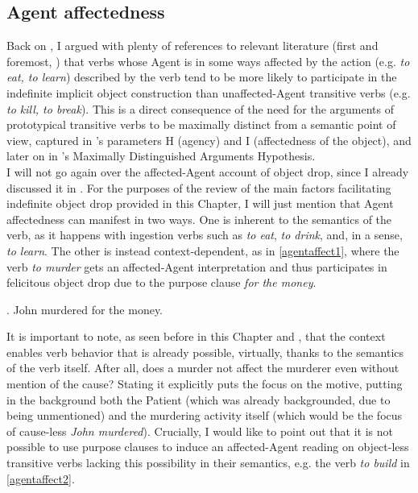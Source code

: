 \subsection{Agent affectedness} 

Back on , I argued with plenty of references to relevant literature (first and foremost, \textcite{Naess2007}) that verbs whose Agent is in some ways affected by the action (e.g. \textit{to eat, to learn}) described by the verb tend to be more likely to participate in the indefinite implicit object construction than unaffected-Agent transitive verbs (e.g. \textit{to kill, to break}). This is a direct consequence of the need for the arguments of prototypical transitive verbs to be maximally distinct from a semantic point of view, captured in \textcite{HopperThompson1980}'s parameters H (agency) and I (affectedness of the object), and later on in \textcite{Naess2007}'s Maximally Distinguished Arguments Hypothesis.\\
I will not go again over the affected-Agent account of object drop, since I already discussed it in . For the purposes of the review of the main factors facilitating indefinite object drop provided in this Chapter, I will just mention that Agent affectedness can manifest in two ways. One is inherent to the semantics of the verb, as it happens with ingestion verbs such as \textit{to eat}, \textit{to drink}, and, in a sense, \textit{to learn}. The other is instead context-dependent, as in \ref{agentaffect1}, where the verb \textit{to murder} gets an affected-Agent interpretation and thus participates in felicitous object drop due to the purpose clause \textit{for the money}.

\ex. \label{agentaffect1} John murdered for the money. \hfill \parencite[136]{Naess2007}

It is important to note, as seen before in this Chapter and , that the context enables verb behavior that is already possible, virtually, thanks to the semantics of the verb itself. After all, does a murder not affect the murderer even without mention of the cause? Stating it explicitly puts the focus on the motive, putting in the background both the Patient (which was already backgrounded, due to being unmentioned) and the murdering activity itself (which would be the focus of cause-less \textit{John murdered}). Crucially, I would like to point out that it is not possible to use purpose clauses to induce an affected-Agent reading on object-less transitive verbs lacking this possibility in their semantics, e.g. the verb \textit{to build} in \ref{agentaffect2}.

